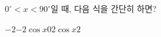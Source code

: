 $0^\circ<x<90^\circ$일 때, 다음 식을 간단히 하면? 
\begin{choices32}{$-2$}{$-2\cos x$}{$0$}{$2\cos x$}{$2$}\end{choices32}
